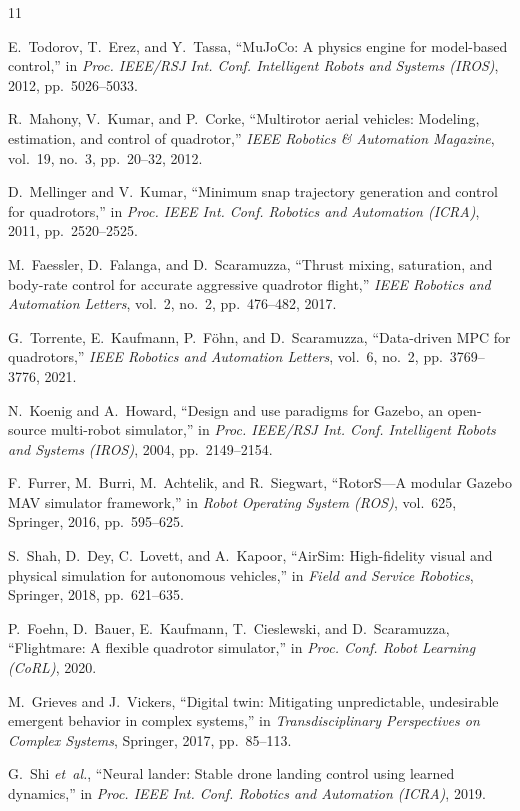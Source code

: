 \documentclass[journal]{IEEEtran}
\begin{document}

\begin{thebibliography}{11}

E.~Todorov, T.~Erez, and Y.~Tassa,
``MuJoCo: A physics engine for model-based control,''
in \emph{Proc. IEEE/RSJ Int. Conf. Intelligent Robots and Systems (IROS)}, 2012, pp.~5026--5033.

R.~Mahony, V.~Kumar, and P.~Corke,
``Multirotor aerial vehicles: Modeling, estimation, and control of quadrotor,''
\emph{IEEE Robotics \& Automation Magazine}, vol.~19, no.~3, pp.~20--32, 2012.

D.~Mellinger and V.~Kumar,
``Minimum snap trajectory generation and control for quadrotors,''
in \emph{Proc. IEEE Int. Conf. Robotics and Automation (ICRA)}, 2011, pp.~2520--2525.

M.~Faessler, D.~Falanga, and D.~Scaramuzza,
``Thrust mixing, saturation, and body-rate control for accurate aggressive quadrotor flight,''
\emph{IEEE Robotics and Automation Letters}, vol.~2, no.~2, pp.~476--482, 2017.

G.~Torrente, E.~Kaufmann, P.~F{\"o}hn, and D.~Scaramuzza,
``Data-driven MPC for quadrotors,''
\emph{IEEE Robotics and Automation Letters}, vol.~6, no.~2, pp.~3769--3776, 2021.

N.~Koenig and A.~Howard,
``Design and use paradigms for Gazebo, an open-source multi-robot simulator,''
in \emph{Proc. IEEE/RSJ Int. Conf. Intelligent Robots and Systems (IROS)}, 2004, pp.~2149--2154.

F.~Furrer, M.~Burri, M.~Achtelik, and R.~Siegwart,
``RotorS---A modular Gazebo MAV simulator framework,''
in \emph{Robot Operating System (ROS)}, vol.~625, Springer, 2016, pp.~595--625.

S.~Shah, D.~Dey, C.~Lovett, and A.~Kapoor,
``AirSim: High-fidelity visual and physical simulation for autonomous vehicles,''
in \emph{Field and Service Robotics}, Springer, 2018, pp.~621--635.

P.~Foehn, D.~Bauer, E.~Kaufmann, T.~Cieslewski, and D.~Scaramuzza,
``Flightmare: A flexible quadrotor simulator,''
in \emph{Proc. Conf. Robot Learning (CoRL)}, 2020.

M.~Grieves and J.~Vickers,
``Digital twin: Mitigating unpredictable, undesirable emergent behavior in complex systems,''
in \emph{Transdisciplinary Perspectives on Complex Systems}, Springer, 2017, pp.~85--113.

G.~Shi \emph{et~al.},
``Neural lander: Stable drone landing control using learned dynamics,''
in \emph{Proc. IEEE Int. Conf. Robotics and Automation (ICRA)}, 2019.

\end{thebibliography}
\end{document}

